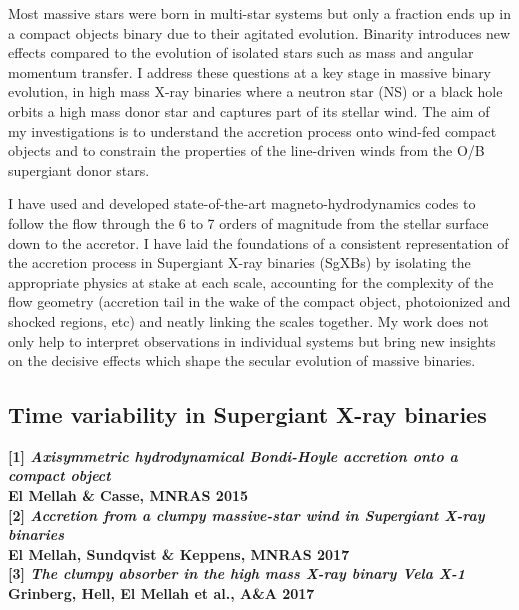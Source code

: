 \documentclass[letterpaper,12pt,onecolumn]{article}
\makeatletter
\newcommand{\sgx}{SgXB\xspace}
\newcommand{\sgxs}{SgXBs\xspace}
\newcommand*{\ns}{NS\@\xspace}
\makeatother
\begin{document}
Most massive stars were born in multi-star systems but only a fraction ends up in a compact objects binary due to their agitated evolution. Binarity introduces new effects compared to the evolution of isolated stars such as mass and angular momentum transfer. I address these questions at a key stage in massive binary evolution, in high mass X-ray binaries where a neutron star (\ns) or a black hole orbits a high mass donor star and captures part of its stellar wind. The aim of my investigations is to understand the accretion process onto wind-fed compact objects and to constrain the properties of the line-driven winds from the O/B supergiant donor stars.

I have used and developed state-of-the-art magneto-hydrodynamics codes to follow the flow through the 6 to 7 orders of magnitude from the stellar surface down to the accretor. I have laid the foundations of a consistent representation of the accretion process in Supergiant X-ray binaries (\sgxs) by isolating the appropriate physics at stake at each scale, accounting for the complexity of the flow geometry (accretion tail in the wake of the compact object, photoionized and shocked regions, etc) and neatly linking the scales together. My work does not only help to interpret observations in individual systems but bring new insights on the decisive effects which shape the secular evolution of massive binaries.


\subsection*{Time variability in Supergiant X-ray binaries}

\footnotesize
\textbf{[1] \textit{Axisymmetric hydrodynamical Bondi-Hoyle accretion onto a compact object}}\\
\hspace*{16pt}\textbf{El Mellah \& Casse, MNRAS 2015}\\
\textbf{[2] \textit{Accretion from a clumpy massive-star wind in Supergiant X-ray binaries}}\\
\hspace*{16pt}\textbf{El Mellah, Sundqvist \& Keppens, MNRAS 2017}\\
\textbf{[3] \textit{The clumpy absorber in the high mass X-ray binary Vela X-1}}\\
\hspace*{16pt}\textbf{Grinberg, Hell, El Mellah et al., A\&A 2017}\\
\end{document}
